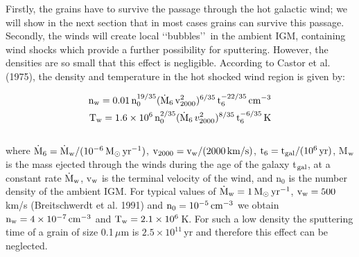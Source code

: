 \documentclass[]{aa}
\begin{document}
Firstly, the grains have to survive the passage through the hot galactic wind;
we will show in the next section that in most cases grains can survive this
passage. Secondly, the winds will create local \lq\lq bubbles\rq\rq\ in the
ambient IGM, containing wind shocks which provide a further
possibility for sputtering.  However, the densities are so small that this
effect is negligible. According to Castor et al. (1975), the density and
temperature in the hot shocked wind region is given by:

\begin{eqnarray}
{\rm n}_{\rm w} = 0.01\,{\rm n}_0^{19/35}({\rm \dot M}_6\,
{\rm v}_{2000}^2)^{6/35}\,{\rm t}_6^{-22/35}\,{\rm cm}^{-3}\\
{\rm T}_{\rm w} = 1.6\times 10^6\,{\rm n}_0^{2/35}({\rm \dot M}_6\,
v_{2000}^2)^{8/35}\,{\rm t}_6^{-6/35}\,{\rm K}
\end{eqnarray}
\\
where ${\rm \dot  M}_6 = {\rm \dot M}_{\rm w}/(10^{-6}\,{\rm M}_{\odot}\,
{\rm yr}^{-1})$, ${\rm v}_{2000} = {\rm v}_{\rm w}/(2000\,{\rm km}/{\rm s})$, 
${\rm t}_6 = {\rm t_{\rm gal}}/(10^6\,{\rm yr})$, M$_{\rm w}$ is the mass 
ejected through  the winds during the age of the galaxy t$_{\rm gal}$, at a 
constant rate ${\rm \dot M}_{\rm w}$, v$_{\rm w}$ is the terminal velocity of 
the wind, and n$_0$ is the number density of the
ambient IGM. For typical values of ${\rm \dot M}_{\rm w}=1\,{\rm M}_{\odot}\,
{\rm yr}^{-1}$, ${\rm v}_{\rm w} = 500$\,km/s 
(Breitschwerdt et al. 1991) and ${\rm n}_0 = 10^{-5}\,{\rm cm}^{-3}$ we obtain
${\rm n}_{\rm w}= 4 \times 10^{-7}\,{\rm cm}^{-3}$ and 
${\rm T}_{\rm w} = 2.1\times 10^6\,$K. 
For such a low density the sputtering time of a grain of size 0.1\,${\mu}$m is
$2.5 \times 10^{11}$\,yr and therefore this effect can be neglected.
\end{document}
